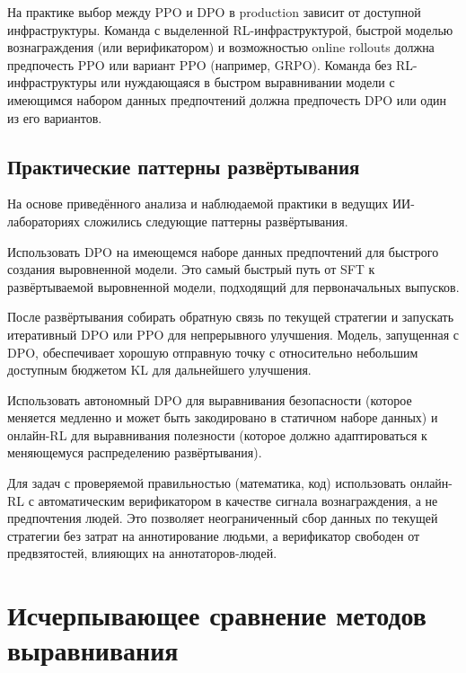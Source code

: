 На практике выбор между PPO и DPO в production зависит от доступной инфраструктуры. Команда с выделенной RL-инфраструктурой, быстрой моделью вознаграждения (или верификатором) и возможностью online rollouts должна предпочесть PPO или вариант PPO (например, GRPO). Команда без RL-инфраструктуры или нуждающаяся в быстром выравнивании модели с имеющимся набором данных предпочтений должна предпочесть DPO или один из его вариантов.

\subsection{Практические паттерны развёртывания}

На основе приведённого анализа и наблюдаемой практики в ведущих ИИ-лабораториях сложились следующие паттерны развёртывания.

\begin{description}[leftmargin=!,labelwidth=3.5cm,align=parleft]
  \item[Начальный запуск с DPO] Использовать DPO на имеющемся наборе данных предпочтений для быстрого создания выровненной модели. Это самый быстрый путь от SFT к развёртываемой выровненной модели, подходящий для первоначальных выпусков.
  \item[Уточнение с онлайн-RL] После развёртывания собирать обратную связь по текущей стратегии и запускать итеративный DPO или PPO для непрерывного улучшения. Модель, запущенная с DPO, обеспечивает хорошую отправную точку с относительно небольшим доступным бюджетом KL для дальнейшего улучшения.
  \item[Разделение безопасности и способностей] Использовать автономный DPO для выравнивания безопасности (которое меняется медленно и может быть закодировано в статичном наборе данных) и онлайн-RL для выравнивания полезности (которое должно адаптироваться к меняющемуся распределению развёртывания).
  \item[RL с верификатором для рассуждений] Для задач с проверяемой правильностью (математика, код) использовать онлайн-RL с автоматическим верификатором в качестве сигнала вознаграждения, а не предпочтения людей. Это позволяет неограниченный сбор данных по текущей стратегии без затрат на аннотирование людьми, а верификатор свободен от предвзятостей, влияющих на аннотаторов-людей.
\end{description}

\section{Исчерпывающее сравнение методов выравнивания}
\label{sec:alignment-comparison}


